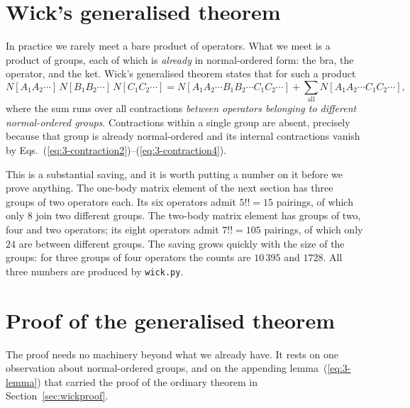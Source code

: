 \section{Wick's generalised theorem}
\label{sec:wickgeneral}

In practice we rarely meet a bare product of operators.  What we meet is a
product of groups, each of which is \emph{already} in normal-ordered form:
the bra, the operator, and the ket.  Wick's generalised theorem states that
for such a product
\begin{equation}
  N\left[A_1A_2\cdots\right]\,N\left[B_1B_2\cdots\right]\,
  N\left[C_1C_2\cdots\right]
   = N\left[A_1A_2\cdots B_1B_2\cdots C_1C_2\cdots\right]
   + \sum_{\mathrm{all}} N\left[A_1A_2\cdots C_1C_2\cdots\right],
  \label{eq:3-wickgeneral}
\end{equation}
where the sum runs over all contractions \emph{between operators belonging to
different normal-ordered groups}.  Contractions within a single group are
absent, precisely because that group is already normal-ordered and its
internal contractions vanish by
Eqs.~(\ref{eq:3-contraction2})--(\ref{eq:3-contraction4}).

This is a substantial saving, and it is worth putting a number on it before we
prove anything.  The one-body matrix element of the next section has three
groups of two operators each.  Its six operators admit $5!!=15$ pairings, of
which only $8$ join two different groups.  The two-body matrix element has
groups of two, four and two operators; its eight operators admit $7!!=105$
pairings, of which only $24$ are between different groups.  The saving grows
quickly with the size of the groups: for three groups of four operators the
counts are $10\,395$ and $1728$.  All three numbers are produced by
\texttt{wick.py}.

\section{Proof of the generalised theorem}
\label{sec:wickgeneralproof}

The proof needs no machinery beyond what we already have.  It rests on one
observation about normal-ordered groups, and on the appending
lemma~(\ref{eq:3-lemma}) that carried the proof of the ordinary theorem in
Section~\ref{sec:wickproof}.

